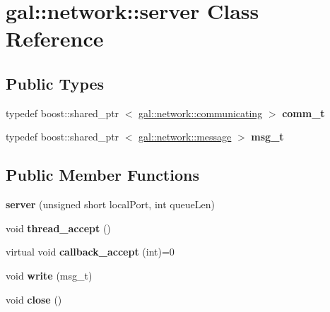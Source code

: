 \hypertarget{classgal_1_1network_1_1server}{\section{gal\-:\-:network\-:\-:server \-Class \-Reference}
\label{classgal_1_1network_1_1server}
}
\subsection*{\-Public \-Types}
\begin{DoxyCompactItemize}
\item 
\hypertarget{classgal_1_1network_1_1server_afc42ccc2573292ca287f04329e90c393}{typedef boost\-::shared\-\_\-ptr\*
$<$ \hyperlink{classgal_1_1network_1_1communicating}{gal\-::network\-::communicating} $>$ {\bfseries comm\-\_\-t}}\label{classgal_1_1network_1_1server_afc42ccc2573292ca287f04329e90c393}

\item 
\hypertarget{classgal_1_1network_1_1server_a381a33367a621576ca4c839bef2e49bd}{typedef boost\-::shared\-\_\-ptr\*
$<$ \hyperlink{classgal_1_1network_1_1message}{gal\-::network\-::message} $>$ {\bfseries msg\-\_\-t}}\label{classgal_1_1network_1_1server_a381a33367a621576ca4c839bef2e49bd}

\end{DoxyCompactItemize}
\subsection*{\-Public \-Member \-Functions}
\begin{DoxyCompactItemize}
\item 
\hypertarget{classgal_1_1network_1_1server_ab1860e93b988732894591fc5c732b1c0}{{\bfseries server} (unsigned short local\-Port, int queue\-Len)}\label{classgal_1_1network_1_1server_ab1860e93b988732894591fc5c732b1c0}

\item 
\hypertarget{classgal_1_1network_1_1server_a15ed05d13f3c164f019319bbf919461e}{void {\bfseries thread\-\_\-accept} ()}\label{classgal_1_1network_1_1server_a15ed05d13f3c164f019319bbf919461e}

\item 
\hypertarget{classgal_1_1network_1_1server_a1914e60f0ced29f6ef1960b00c1ec0c5}{virtual void {\bfseries callback\-\_\-accept} (int)=0}\label{classgal_1_1network_1_1server_a1914e60f0ced29f6ef1960b00c1ec0c5}

\item 
\hypertarget{classgal_1_1network_1_1server_aa2c98b69e7429a6811ce7e8ac959ceec}{void {\bfseries write} (msg\-\_\-t)}\label{classgal_1_1network_1_1server_aa2c98b69e7429a6811ce7e8ac959ceec}

\item 
\hypertarget{classgal_1_1network_1_1server_a338a20b03a964019c062111791c41873}{void {\bfseries close} ()}\label{classgal_1_1network_1_1server_a338a20b03a964019c062111791c41873}

\end{DoxyCompactItemize}
